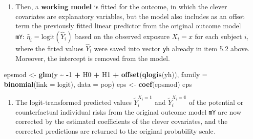 \documentclass[
]{book}
\newenvironment{Shaded}{\begin{snugshade}}{\end{snugshade}}
\newcommand{\AttributeTok}[1]{\textcolor[rgb]{0.13,0.29,0.53}{#1}}
\newcommand{\DecValTok}[1]{\textcolor[rgb]{0.00,0.00,0.81}{#1}}
\newcommand{\FunctionTok}[1]{\textcolor[rgb]{0.13,0.29,0.53}{\textbf{#1}}}
\newcommand{\NormalTok}[1]{#1}
\newcommand{\OtherTok}[1]{\textcolor[rgb]{0.56,0.35,0.01}{#1}}
\newcommand{\SpecialCharTok}[1]{\textcolor[rgb]{0.81,0.36,0.00}{\textbf{#1}}}
\providecommand{\tightlist}{%
  \setlength{\itemsep}{0pt}\setlength{\parskip}{0pt}}
\begin{document}
\begin{enumerate}
\def\labelenumi{\arabic{enumi}.}
\setcounter{enumi}{1}
\tightlist
\item
  Then, a \textbf{working model} is fitted for the outcome, in which the
  clever covariates are explanatory variables, but the model also
  includes as an offset term the previously fitted linear predictor
  from the original outcome model \texttt{mY}:
  \(\widehat{\eta}_i = \text{logit}(\widehat Y_i)\) based on the
  observed exposure \(X_i=x\) for each subject \(i\), where the fitted
  values \(\widehat Y_i\) were saved into vector \texttt{yh} already in item
  5.2 above. Moreover, the intercept is removed from the model.
\end{enumerate}

\begin{Shaded}
\begin{Highlighting}[]
\NormalTok{epsmod }\OtherTok{\textless{}{-}} \FunctionTok{glm}\NormalTok{(y }\SpecialCharTok{\textasciitilde{}} \SpecialCharTok{{-}}\DecValTok{1} \SpecialCharTok{+}\NormalTok{ H0 }\SpecialCharTok{+}\NormalTok{ H1 }\SpecialCharTok{+} \FunctionTok{offset}\NormalTok{(}\FunctionTok{qlogis}\NormalTok{(yh)),}
  \AttributeTok{family =} \FunctionTok{binomial}\NormalTok{(}\AttributeTok{link =}\NormalTok{ logit), }\AttributeTok{data =}\NormalTok{ pop)}
\NormalTok{eps }\OtherTok{\textless{}{-}} \FunctionTok{coef}\NormalTok{(epsmod)}
\NormalTok{eps}
\end{Highlighting}
\end{Shaded}

\begin{enumerate}
\def\labelenumi{\arabic{enumi}.}
\setcounter{enumi}{2}
\tightlist
\item
  The logit-transformed predicted values \(\widetilde{Y}_i^{X_i=1}\) and
  \(\widetilde{Y}_i^{X_i=0}\) of the potential or counterfactual
  individual risks from the original outcome model \texttt{mY} are now
  corrected by the estimated coefficients of the clever covariates,
  and the corrected predictions are returned to the original
  probability scale.
\end{enumerate}

\begin{Shaded}
\end{Shaded}
\end{document}

